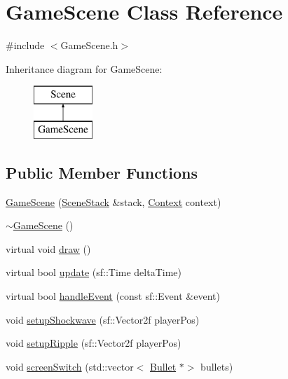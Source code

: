 \hypertarget{class_game_scene}{}\section{Game\+Scene Class Reference}
\label{class_game_scene}


{\ttfamily \#include $<$Game\+Scene.\+h$>$}

Inheritance diagram for Game\+Scene\+:\begin{figure}[H]
\begin{center}
\leavevmode
\includegraphics[height=2.000000cm]{class_game_scene}
\end{center}
\end{figure}
\subsection*{Public Member Functions}
\begin{DoxyCompactItemize}
\item 
\hyperlink{class_game_scene_a09ae1eacea6ea92074d008c016e0ed1f}{Game\+Scene} (\hyperlink{class_scene_stack}{Scene\+Stack} \&stack, \hyperlink{struct_scene_1_1_context}{Context} context)
\item 
\hyperlink{class_game_scene_add5bc48c372aaa7f526c02558a8adf00}{$\sim$\+Game\+Scene} ()
\item 
virtual void \hyperlink{class_game_scene_ae9eb60cbb8fa55eeb07b951e3d83f426}{draw} ()
\item 
virtual bool \hyperlink{class_game_scene_ae54628d2f041bcad66242584b2db10d6}{update} (sf\+::\+Time delta\+Time)
\item 
virtual bool \hyperlink{class_game_scene_aa494372b1f451f3c3a268558fddb30f2}{handle\+Event} (const sf\+::\+Event \&event)
\item 
void \hyperlink{class_game_scene_a67664e1bbce6bec9eda855a9b109d9ec}{setup\+Shockwave} (sf\+::\+Vector2f player\+Pos)
\item 
void \hyperlink{class_game_scene_aca0b30f731595929fb7182e2f65941b1}{setup\+Ripple} (sf\+::\+Vector2f player\+Pos)
\item 
void \hyperlink{class_game_scene_a030583d6469d9f44fda3fc5777c46a08}{screen\+Switch} (std\+::vector$<$ \hyperlink{class_bullet}{Bullet} $\ast$$>$ bullets)
\end{DoxyCompactItemize}
